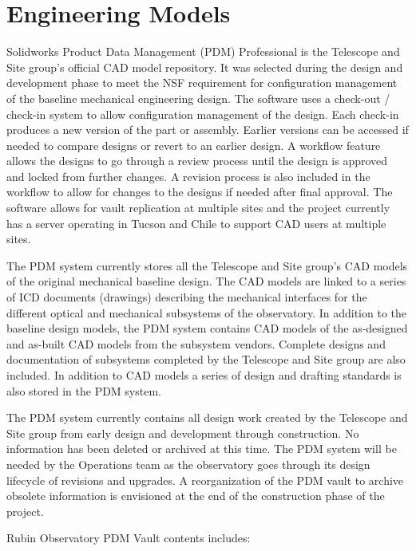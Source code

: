 \newpage
\section{Engineering Models}

Solidworks Product Data Management (PDM) Professional \citep{PDM-cite} is the Telescope and Site group's official CAD model repository. It was selected during the design and development phase to meet the NSF requirement for configuration management of the baseline mechanical engineering design. The software uses a check-out / check-in system to allow configuration management of the design. Each check-in produces a new version of the part or assembly. Earlier versions can be accessed if needed to compare designs or revert to an earlier design. A workflow feature allows the designs to go through a review process until the design is approved and locked from further changes. A revision process is also included in the workflow to allow for changes to the designs if needed after final approval. The software allows for vault replication at multiple sites and the project currently has a server operating in Tucson and Chile to support CAD users at multiple sites.

The PDM system currently stores all the Telescope and Site group's CAD models of the original mechanical baseline design. The CAD models are linked to a series of ICD documents (drawings) describing the mechanical interfaces for the different optical and mechanical subsystems of the observatory. In addition to the baseline design models, the PDM system contains CAD models of the as-designed and as-built CAD models from the subsystem vendors. Complete designs and documentation of subsystems completed by the Telescope and Site group are also included. In addition to CAD models a series of design and drafting standards is also stored in the PDM system.

The PDM system currently contains all design work created by the Telescope and Site group from early design and development through construction. No information has been deleted or archived at this time. The PDM system will be needed by the Operations team as the observatory goes through its design lifecycle of revisions and upgrades. A reorganization of the PDM vault to archive obsolete information is envisioned at the end of the construction phase of the project.

Rubin Observatory PDM Vault contents includes:

